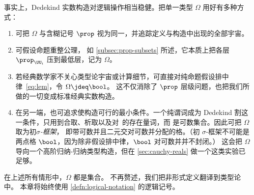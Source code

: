 事实上，Dedekind 实数构造对逻辑操作相当稳健。把单一类型 $\Omega$ 用好有多种方式：
%
\begin{enumerate}

\item 可把 $\Omega$ 与含糊记号 $\prop$ 视为同一，并追踪定义与构造中出现的全部宇宙。

\item 可假设命题重整公理，
  如 \cref{subsec:prop-subsets} 所述，它本质上把各层 $\prop_{\UU_i}$ 压到最低层，记为 $\Omega$。

\item 若经典数学家不关心类型论宇宙或计算细节，可直接对纯命题假设排中律~\eqref{eq:lem}，令 $\Omega \jdeq \bool$。
  这不仅消除了 $\prop$ 层级问题，也把我们所做的一切变成标准经典实数构造。

\item 在另一端，也可追求使构造可行的最小条件。一个纯谓词成为 Dedekind 割这一条件，只用到合取、析取以及对~\Q 的存在量词，而 \Q 是可数集合。因此可把 $\Omega$ 取为初\emph{$\sigma$-框架}，
  即带可数并且二元交对可数并分配的格。（初 $\sigma$-框架不可能是两点格 $\bool$，因为除非假设排中律，$\bool$ 对可数并并不封闭。）
  这会把 $\Omega$ 导向一个高阶归纳-归纳类型构造，但在 \cref{sec:cauchy-reals} 做一个这类实验已足够。
\end{enumerate}

在上述所有情形中，$\Omega$ 都是集合。
%
不再赘述，我们把非形式定义翻译到类型论中。
本章将始终使用
\cref{defn:logical-notation} 的逻辑记号。

